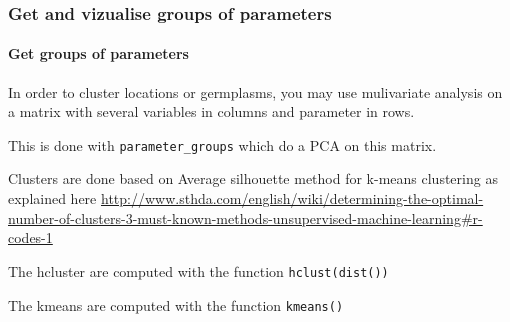 \documentclass{article}\usepackage[]{graphicx}\usepackage[]{color}
\makeatletter
\newcommand{\hlopt}[1]{\textcolor[rgb]{0,0,0}{#1}}%
\newcommand{\hlstd}[1]{\textcolor[rgb]{0.345,0.345,0.345}{#1}}%
\newenvironment{kframe}{%
 \def\at@end@of@kframe{}%
 \ifinner\ifhmode%
  \def\at@end@of@kframe{\end{minipage}}%
  \begin{minipage}{\columnwidth}%
 \fi\fi%
 \def\FrameCommand##1{\hskip\@totalleftmargin \hskip-\fboxsep
 \colorbox{shadecolor}{##1}\hskip-\fboxsep
     \hskip-\linewidth \hskip-\@totalleftmargin \hskip\columnwidth}%
 \MakeFramed {\advance\hsize-\width
   \@totalleftmargin\z@ \linewidth\hsize
   \@setminipage}}%
 {\par\unskip\endMakeFramed%
 \at@end@of@kframe}
\newenvironment{knitrout}{}{} %
\makeatother
\begin{document}


\subsubsection{Get and vizualise groups of parameters}

\paragraph{Get groups of parameters}

In order to cluster locations or germplasms, you may use mulivariate analysis on a matrix with several variables in columns and parameter in rows.

This is done with \texttt{parameter\_groups} which do a PCA on this matrix.

Clusters are done based on Average silhouette method for k-means clustering as explained here \url{http://www.sthda.com/english/wiki/determining-the-optimal-number-of-clusters-3-must-known-methods-unsupervised-machine-learning#r-codes-1}

The hcluster are computed with the function \texttt{hclust(dist())}

The kmeans are computed with the function \texttt{kmeans()}
\end{document}
